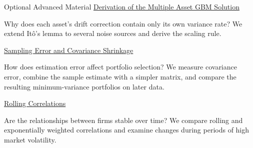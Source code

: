 \documentclass[aspectratio=169,11pt]{beamer}
\begin{document}
\begin{frame}{Optional Advanced Material}
  \textbf{}
  \href{https://github.com/varnerlab/CHEME-5660-CourseRepository-Fall-2026/blob/main/lectures/week-5/L5b/advanced/ito-derivation/CHEME-5660-L5b-Derivation-MAGBM-Solution-Fall-2026.ipynb}{Derivation of the Multiple Asset GBM Solution}

  Why does each asset's drift correction contain only its own variance rate?
  We extend It\^o's lemma to several noise sources and derive the scaling rule.

  \vspace{0.8em}
  \textbf{}
  \href{https://github.com/varnerlab/CHEME-5660-CourseRepository-Fall-2026/blob/main/lectures/week-5/L5b/advanced/covariance-estimation/CHEME-5660-L5b-Advanced-CovarianceEstimation-Fall-2026.ipynb}{Sampling Error and Covariance Shrinkage}

  How does estimation error affect portfolio selection? We measure covariance
  error, combine the sample estimate with a simpler matrix, and compare the
  resulting minimum-variance portfolios on later data.

  \vspace{0.8em}
  \textbf{}
  \href{https://github.com/varnerlab/CHEME-5660-CourseRepository-Fall-2026/blob/main/lectures/week-5/L5b/advanced/rolling-correlation/CHEME-5660-L5b-Advanced-RollingCorrelation-Fall-2026.ipynb}{Rolling Correlations}

  Are the relationships between firms stable over time? We compare rolling and
  exponentially weighted correlations and examine changes during periods of
  high market volatility.

  \vspace{0.6em}
\end{frame}
\end{document}
